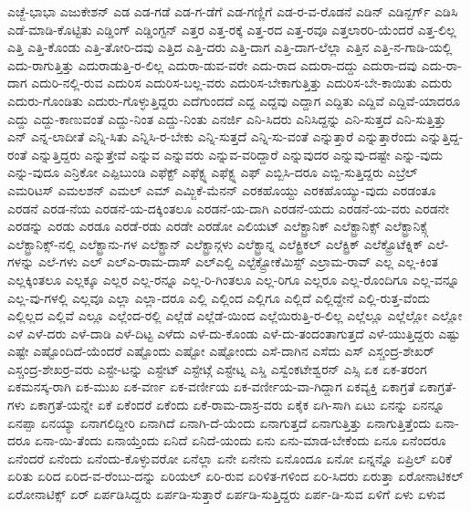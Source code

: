 {ಎಚ್ಜೆ-ಭಾಭಾ
ಎಜುಕೇಶನ್
ಎಡ
ಎಡ-ಗಡೆ
ಎಡ-ಗ-ಡೆಗೆ
ಎಡ-ಗಣ್ಣಿಗೆ
ಎಡ-ರ-ವ-ರೊಡನೆ
ಎಡಿನ್
ಎಡಿನ್ಬರ್ಗ್
ಎಡಿಸಿ
ಎಡೆ-ಮಾಡಿ-ಕೊಟ್ಟಿತು
ಎಡ್ಡಿಂಗ್
ಎಡ್ಡಿಂಗ್ಟನ್
ಎತ್ತರ
ಎತ್ತ-ರಕ್ಕೆ
ಎತ್ತ-ರದ
ಎತ್ತ-ರವೂ
ಎತ್ತಲಾರರಿ-ಯೆಂದರೆ
ಎತ್ತ-ಲಿಲ್ಲ
ಎತ್ತಿ
ಎತ್ತಿ-ಕೊಂಡು
ಎತ್ತಿ-ತೋರಿ-ದವು
ಎತ್ತಿದ
ಎತ್ತಿ-ದರು
ಎತ್ತಿ-ದಾಗ
ಎತ್ತಿ-ದಾಗ-ಲೆಲ್ಲಾ
ಎತ್ತಿನ
ಎತ್ತಿ-ನ-ಗಾಡಿ-ಯಲ್ಲಿ
ಎದು-ರಾಗುತ್ತಿತ್ತು
ಎದುರಾಡುತ್ತಿ-ರ-ಲಿಲ್ಲ
ಎದುರಾ-ಡುವ-ವರೇ
ಎದು-ರಾದ
ಎದುರಾ-ದದ್ದು
ಎದುರಾ-ದವು
ಎದು-ರಾ-ದಾಗ
ಎದುರಿ-ನಲ್ಲಿ-ರುವ
ಎದುರಿಸ
ಎದುರಿಸ-ಬಲ್ಲ-ವರು
ಎದುರಿಸ-ಬೇಕಾಗುತ್ತಿತ್ತು
ಎದುರಿಸ-ಬೇ-ಕಾಯಿತು
ಎದುರು
ಎದುರು-ಗೊಂಡಿತು
ಎದುರು-ಗೊಳ್ಳುತ್ತಿದ್ದರು
ಎದೆಗುಂದದೆ
ಎದ್ದ
ಎದ್ದವು
ಎದ್ದಾಗ
ಎದ್ದಿತು
ಎದ್ದಿವೆ
ಎದ್ದಿವೆ-ಯಾದರೂ
ಎದ್ದು
ಎದ್ದು-ಕಾಣುವಂತೆ
ಎದ್ದು-ನಿಂತ
ಎದ್ದು-ನಿಂತು
ಎನರ್ಜಿ
ಎನಿ-ಸಿದರು
ಎನಿಸಿದ್ದನ್ನು
ಎನಿ-ಸುತ್ತದೆ
ಎನಿ-ಸುತ್ತಿತ್ತು
ಎನ್
ಎನ್ನ-ಲಾದೀತೆ
ಎನ್ನಿ-ಸಿತು
ಎನ್ನಿಸಿ-ರ-ಬೇಕು
ಎನ್ನಿ-ಸುತ್ತದೆ
ಎನ್ನಿ-ಸು-ವಂತೆ
ಎನ್ನುತ್ತಾರೆ
ಎನ್ನುತ್ತಾರೆಂದು
ಎನ್ನುತ್ತಿದ್ದ-ರಂತೆ
ಎನ್ನುತ್ತಿದ್ದರು
ಎನ್ನುತ್ತೇವೆ
ಎನ್ನುವ
ಎನ್ನುವರು
ಎನ್ನುವ-ವರಿದ್ದಾರೆ
ಎನ್ನುವುದರ
ಎನ್ನುವು-ದಷ್ಟೇ
ಎನ್ನು-ವುದು
ಎನ್ನು-ವುದೂ
ಎನ್ರಿಕೋ
ಎಪ್ಪಿಬುಂಡಿ
ಎಫೆಕ್ಟ್
ಎಫೆಕ್ಟ್ನ
ಎಫೆಕ್ಟ್ನ
ಎಫ್
ಎಬ್ಬಿಸಿ-ದರೂ
ಎಬ್ಬಿ-ಸುತ್ತಿದ್ದರು
ಎಬ್ರೆಲ್
ಎಮರಿಟಸ್
ಎಮಲಶನ್
ಎಮಲ್
ಎಮ್
ಎಮ್ಜಿಕೆ-ಮೆನನ್
ಎರಕಹೊಯ್ದು
ಎರಕಹೊಯ್ಯು-ವುದು
ಎರಡಂತೂ
ಎರಡನೆ
ಎರಡ-ನೆಯ
ಎರಡನೆ-ಯ-ದಕ್ಕಿಂತಲೂ
ಎರಡನೆ-ಯ-ದಾಗಿ
ಎರಡನೆ-ಯದು
ಎರಡನೆ-ಯ-ವರು
ಎರಡನೇ
ಎರಡನ್ನು
ಎರಡು
ಎರಡೂ
ಎರಡೆ-ರಡು
ಎರಡೇ
ಎರಡೋ
ಎಲಿಯಟ್
ಎಲೆಕ್ಟ್ರಾನಿಕ್
ಎಲೆಕ್ಟ್ರಾನಿಕ್ಸ್
ಎಲೆಕ್ಟ್ರಾನಿಕ್ಸ್ಗೆ
ಎಲೆಕ್ಟ್ರಾನಿಕ್ಸ್-ನಲ್ಲಿ
ಎಲೆಕ್ಟ್ರಾನು-ಗಳ
ಎಲೆಕ್ಟ್ರಾನ್
ಎಲೆಕ್ಟ್ರಾನ್ಗಳು
ಎಲೆಕ್ಟ್ರಾನ್ನ
ಎಲೆಕ್ಟ್ರಿಕಲ್
ಎಲೆಕ್ಟ್ರಿಕ್
ಎಲೆಕ್ಟ್ರೊಟೆಕ್ನಿಕ್
ಎಲೆ-ಗಳನ್ನು
ಎಲೆ-ಗಳು
ಎಲ್
ಎಲ್ಎ-ರಾಮ-ದಾಸ್
ಎಲ್ಎಲ್ಡಿ
ಎಲ್ಟೆಕ್ಟ್ರೋಕೆಮಿಸ್ಟ್
ಎಲ್ರಾಮ-ರಾವ್
ಎಲ್ಲ
ಎಲ್ಲ-ಕಿಂತ
ಎಲ್ಲಕ್ಕಿಂತಲೂ
ಎಲ್ಲಕ್ಕೂ
ಎಲ್ಲರ
ಎಲ್ಲ-ರನ್ನೂ
ಎಲ್ಲ-ರಿ-ಗಿಂತಲೂ
ಎಲ್ಲ-ರಿಗೂ
ಎಲ್ಲರೂ
ಎಲ್ಲ-ರೊಂದಿಗೂ
ಎಲ್ಲ-ವನ್ನೂ
ಎಲ್ಲ-ವು-ಗಳಲ್ಲಿ
ಎಲ್ಲವೂ
ಎಲ್ಲಾ
ಎಲ್ಲಾ-ದರೂ
ಎಲ್ಲಿ
ಎಲ್ಲಿಂದ
ಎಲ್ಲಿಗೂ
ಎಲ್ಲಿದೆ
ಎಲ್ಲಿದ್ದೇನೆ
ಎಲ್ಲಿ-ರುತ್ತ-ವೆಂದು
ಎಲ್ಲಿಲ್ಲದ
ಎಲ್ಲಿವೆ
ಎಲ್ಲೂ
ಎಲ್ಲೆಂದ-ರಲ್ಲಿ
ಎಲ್ಲೆಡೆ
ಎಲ್ಲೆಡೆ-ಯಿಂದ
ಎಲ್ಲೆಯಿರುತ್ತಿ-ರ-ಲಿಲ್ಲ
ಎಲ್ಲೆಲ್ಲೂ
ಎಲ್ಲೆಲ್ಲೋ
ಎಲ್ಲೋ
ಎಳೆ
ಎಳೆ-ದರು
ಎಳೆ-ದಾಡಿ
ಎಳೆ-ದಿಟ್ಟ
ಎಳೆದು
ಎಳೆ-ದು-ಕೊಂಡು
ಎಳೆ-ದು-ತಂದಂತಾಗುತ್ತದೆ
ಎಳೆ-ಯುತ್ತಿದ್ದರು
ಎಷ್ಟು
ಎಷ್ಟೇ
ಎಷ್ಟೊಂದಿದೆ-ಯೆಂದರೆ
ಎಷ್ಟೊಂದು
ಎಷ್ಟೋ
ಎಷ್ಟೋಂದು
ಎಸೆ-ದಾಗಿನ
ಎಸೆದು
ಎಸ್
ಎಸ್ಚಂದ್ರ-ಶೇಖರ್
ಎಸ್ಚಂದ್ರ-ಶೇಖರ್ರ-ವರು
ಎಸ್ಟೇ-ಟನ್ನು
ಎಸ್ಟೇಟ್
ಎಸ್ಟೇಟ್ಗೆ
ಎಸ್ಟೇಟ್ನ
ಎಸ್ಡಿ
ಎಸ್ವೆಂಕಟೇಶ್ವರನ್
ಎಸ್ಸಿ
ಏಕ
ಏಕ-ತರಂಗ
ಏಕಮನಸ್ಕ-ರಾಗಿ
ಏಕ-ಮುಖ
ಏಕ-ವರ್ಣ
ಏಕ-ವರ್ಣೀಯ
ಏಕ-ವರ್ಣೀಯ-ವಾ-ಗಿದ್ದಾಗ
ಏಕವ್ಯಕ್ತಿ
ಏಕಾಗ್ರತೆ
ಏಕಾಗ್ರತೆ-ಗಳು
ಏಕಾಗ್ರತೆ-ಯನ್ನೇ
ಏಕೆ
ಏಕೆಂದರೆ
ಏಕೆಂದು
ಏಕೆ-ರಾಮ-ದಾಸ್ರ-ವರು
ಏಕೈಕ
ಏಗಿ-ಸಾಗಿ
ಏಟು
ಏನನ್ನು
ಏನನ್ನೂ
ಏನಪ್ಪಾ
ಏನಯ್ಯಾ
ಏನಾಗಲಿದ್ದೀರಿ
ಏನಾಗಿದೆ
ಏನಾಗಿ-ದೆ-ಯೆಂದು
ಏನಾಗುತ್ತದೆ
ಏನಾಗುತ್ತಿತ್ತು
ಏನಾಗುತ್ತಿತ್ತೆಂದು
ಏನಾ-ದರೂ
ಏನಾ-ಯಿ-ತೆಂದು
ಏನಾಯ್ತೆಂದು
ಏನಿದೆ
ಏನಿದೆ-ಯಂದು
ಏನು
ಏನು-ಮಾಡ-ಬೇಕೆಂದು
ಏನೂ
ಏನೆಂದರೂ
ಏನೆಂದರೆ
ಏನೆಂದು
ಏನೆಂದು-ಕೊಳ್ಳುವರೋ
ಏನೆಲ್ಲಾ
ಏನೇ
ಏನೇನು
ಏನೊಂದೂ
ಏನೋ
ಏನ್ನನ್ನೊ
ಏಪ್ರಿಲ್
ಏರಿಕೆ
ಏರಿತು
ಏರಿದ
ಏರಿದ-ವ-ರೆಂಬು-ದನ್ನು
ಏರಿಯಲ್
ಏರಿ-ರುವ
ಏರಿಳಿತ-ಗಳಿಂದ
ಏರಿ-ಸಿದರು
ಏರುತ್ತಾ
ಏರೋನಾಟಿಕಲ್
ಏರೋನಾಟಿಕ್ಸ್
ಏರ್
ಏರ್ಪಡಿಸಿದ್ದರು
ಏರ್ಪಡಿ-ಸುತ್ತಾರೆ
ಏರ್ಪಡಿ-ಸುತ್ತಿದ್ದರು
ಏರ್ಪ-ಡಿ-ಸುವ
ಏಳಿಗೆ
ಏಳು
ಏಳುವ
}
